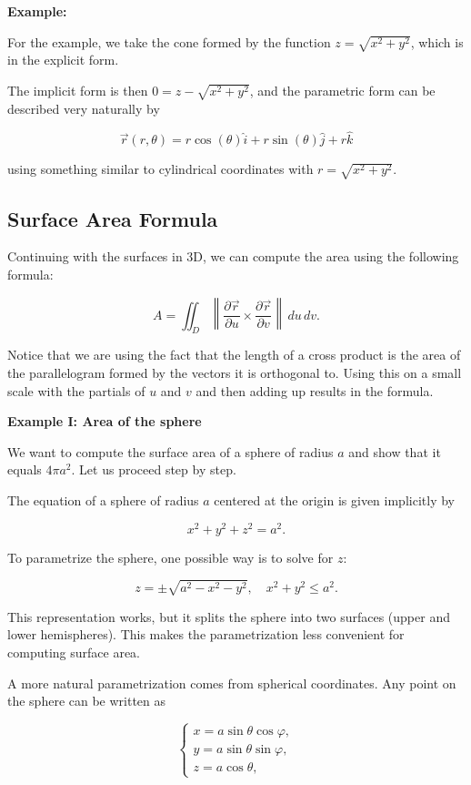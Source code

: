 \textbf{Example:}

For the example, we take the cone formed by the function \(z = \sqrt{x^{2} + y^{2}}\), which is in the explicit form. 

The implicit form is then \(0 = z - \sqrt{x^{2} + y^{2}}\), and the parametric form can be described very naturally by 

\[
    \vec{r}(r,\theta) = r \cos(\theta) \hat{i} + r \sin(\theta) \hat{j} + r \hat{k}
\]

using something similar to cylindrical coordinates with \(r = \sqrt{x^{2} + y^{2}}\).

\subsection{Surface Area Formula}

Continuing with the surfaces in 3D, we can compute the area using the following formula:

\[
    A = \iint_{D} \left\| \frac{\partial \vec{r}}{\partial u} \times \frac{\partial \vec{r}}{\partial v} \right\| \, du \, dv.
\]

Notice that we are using the fact that the length of a cross product is the area of the parallelogram formed by the vectors 
it is orthogonal to. Using this on a small scale with the partials of \(u\) and \(v\) and then adding up results in the formula.

\textbf{Example I: Area of the sphere}

We want to compute the surface area of a sphere of radius \(a\) and show that it equals \(4\pi a^{2}\). Let us proceed step by step.

The equation of a sphere of radius \(a\) centered at the origin is given implicitly by

\[
    x^{2} + y^{2} + z^{2} = a^{2}.
\]

To parametrize the sphere, one possible way is to solve for \(z\):

\[
    z = \pm \sqrt{a^{2} - x^{2} - y^{2}}, \quad x^{2} + y^{2} \leq a^{2}.
\]

This representation works, but it splits the sphere into two surfaces (upper and lower hemispheres). This makes the parametrization less convenient 
for computing surface area.

A more natural parametrization comes from spherical coordinates. Any point on the sphere can be written as

\[
    \begin{cases}
        x = a \sin \theta \cos \varphi, \\
        y = a \sin \theta \sin \varphi, \\
        z = a \cos \theta,
    \end{cases}
\]

